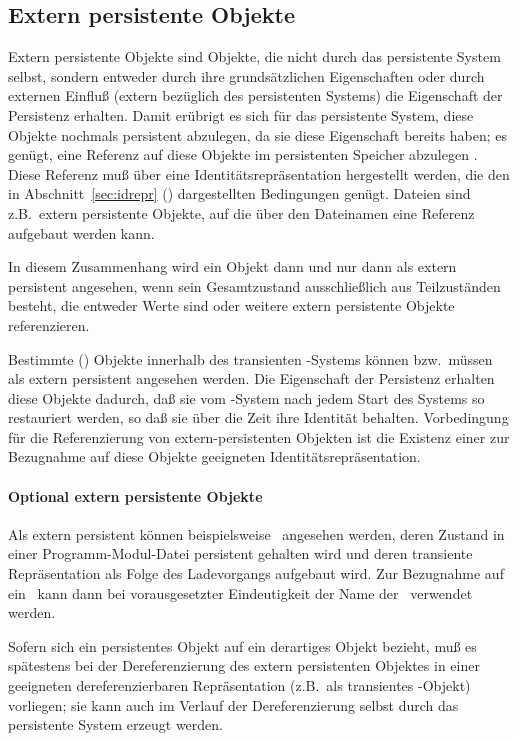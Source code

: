 \subsection{Extern persistente Objekte}%
\label{sec:extp}%
%
Extern persistente Objekte sind Objekte, die nicht durch das
persistente System selbst, sondern entweder durch ihre
grunds\"{a}tzlichen Eigenschaften oder durch externen Einflu\ss{} (extern
be\-z\"{u}g\-lich des persistenten Systems) die Eigenschaft der
Persistenz erhalten. Damit er\"{u}brigt es sich f\"{u}r das persistente
System, diese Objekte nochmals persistent abzulegen, da sie diese
Eigenschaft bereits haben; es gen\"{u}gt, eine Referenz auf diese Objekte
im persistenten Speicher abzulegen
\cite[]{bib:he89}. Diese Referenz mu\ss{} \"{u}ber eine
Identit\"{a}tsrepr\"{a}sentation hergestellt werden, die den in
Abschnitt~\ref{sec:idrepr} (\citepage{\pageref{sec:idrepr}})
dargestellten Bedingungen gen\"{u}gt.  Dateien sind z.B.\ extern
persistente Objekte, auf die \"{u}ber den Dateinamen eine Referenz
aufgebaut werden kann.
%
\par{}In diesem Zusammenhang wird ein Objekt dann und nur dann als
extern persistent angesehen, wenn sein Gesamtzustand ausschlie\ss{}lich
aus Teilzust\"{a}nden besteht, die entweder Werte sind oder
weitere extern persistente Objekte referenzieren.
%
\par{}Bestimmte (\clos) Objekte innerhalb des transienten \cl-Systems
k\"{o}nnen bzw.\ m\"{u}ssen als extern persistent angesehen werden. Die
Eigenschaft der Persistenz erhalten diese Objekte dadurch, da\ss{} sie
vom \cl-System nach jedem Start des Systems so restauriert werden, so
da\ss{} sie \"{u}ber die Zeit ihre Identit\"{a}t behalten.  Vorbedingung f\"{u}r
die Referenzierung von extern-persistenten Objekten ist die Existenz
einer zur Bezugnahme auf diese Objekte geeigneten
Identit\"{a}tsrepr\"{a}sentation.
%
\paragraph{Optional extern persistente Objekte}%
%
Als extern persistent k\"{o}nnen beispielsweise \clsmo[e]\ angesehen
werden, deren Zustand in einer Programm-Modul-Datei persistent
gehalten wird und deren transiente Repr\"{a}sentation als Folge des
Ladevorgangs aufgebaut wird. Zur Bezugnahme auf ein \clsmo\ kann dann
bei vorausgesetzter Eindeutigkeit der Name der \cls\ verwendet
werden.
%
\par{}Sofern sich ein persistentes Objekt auf ein derartiges
Objekt bezieht, mu\ss{} es sp\"{a}testens bei der Dereferenzierung des
extern persistenten Objektes in einer geeigneten dereferenzierbaren
Repr\"{a}sentation (z.B.\ als transientes \clos-Objekt) vorliegen; sie
kann auch im Verlauf der Dereferenzierung selbst durch
das persistente System erzeugt werden.
%
